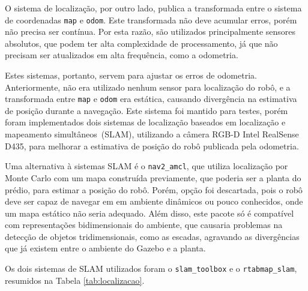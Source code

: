 \documentclass[repeatfields,xlists,xpacks,oneside,yearsonly]{ufrgscca}
\begin{document}
O sistema de localização, por outro lado, publica a transformada
entre o sistema de coordenadas \texttt{map} e \texttt{odom}. Este
transformada não deve acumular erros, porém não precisa ser contínua.
Por esta razão, são utilizados principalmente sensores absolutos, que
podem ter alta complexidade de processamento, já que não precisam ser
atualizados em alta frequência, como a odometria.

Estes sistemas, portanto, servem para ajustar os erros de odometria.
Anteriormente, não era utilizado nenhum sensor para localização do
robô, e a transformada entre \texttt{map} e \texttt{odom} era
estática, causando divergência na estimativa de posição durante a
navegação. Este sistema foi mantido para testes, porém foram
implementados dois sistemas de localização baseados em localização e
mapeamento simultâneos~(SLAM), utilizando a câmera RGB-D Intel
RealSense D435, para melhorar a estimativa de posição do robô
publicada pela odometria.

Uma alternativa à sistemas SLAM é o \texttt{nav2\_amcl}, que utiliza
localização por Monte Carlo com um mapa construída previamente, que
poderia ser a planta do prédio, para estimar a posição do robô.
Porém, opção foi descartada, pois o robô deve ser capaz de navegar em
em ambiente dinâmicos ou pouco conhecidos, onde um mapa estático não
seria adequado. Além disso, este pacote só é compatível com
representações bidimensionais do ambiente, que causaria problemas na
detecção de objetos tridimensionais, como as escadas, agravando as
divergências que já existem entre o ambiente do Gazebo e a planta.

Os dois sistemas de SLAM utilizados foram o \texttt{slam\_toolbox} e
o \texttt{rtabmap\_slam}, resumidos na Tabela \ref{tab:localizacao}.
\end{document}
